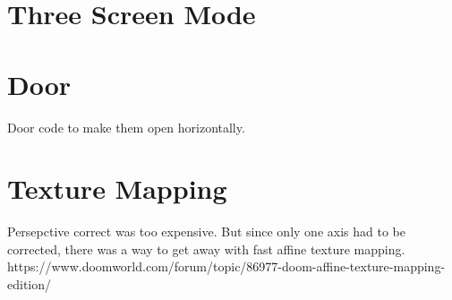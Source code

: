 \section{Three Screen Mode}


\section{Door}
Door code to make them open horizontally.
\section{Texture Mapping}
Persepctive correct was too expensive. But since only one axis had to be corrected, there was a way to get away with fast affine texture mapping.\\
https://www.doomworld.com/forum/topic/86977-doom-affine-texture-mapping-edition/\\
\par